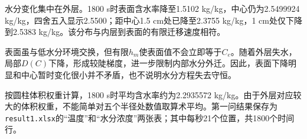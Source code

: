 

水分变化集中在外层。1800 s时表面含水率降至1.5102 kg/kg，中心仍为2.5499924 kg/kg，四舍五入显示2.5500；距中心1.5 cm处已降至2.3755 kg/kg，1 cm处仅下降到2.5383 kg/kg。该分布与内层到表面的有限迁移速度相符。

表面虽与低水分环境交换，但有限$h_m$使表面值不会立即等于$C_e$。随着外层失水，局部$D(C)$下降，形成较陡梯度，进一步限制内部水分外迁。因此，表面下降明显和中心暂时变化很小并不矛盾，也不说明水分方程失去守恒。

按圆柱体积权重计算，1800 s时平均含水率约为2.2935572 kg/kg。由于外层对应较大的体积权重，不能简单对五个半径处数值取算术平均。第一问结果保存为\texttt{result1.xlsx}的“温度”和“水分浓度”两张表；其中每秒21个位置，共1800个时间行。
